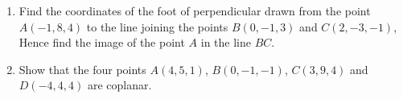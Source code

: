 \begin{enumerate}
\item Find the coordinates of the foot of perpendicular drawn from the point $A(-1, 8, 4)$ to the line joining the points $B(0, -1, 3)$  and $C(2, -3, -1)$, Hence find the image of the point $A$ in the line $BC$.
\item Show that the four points $A(4, 5, 1)$, $B(0, -1, -1)$, $C(3, 9, 4)$ and $D(-4, 4, 4)$ are coplanar.
\end{enumerate}
